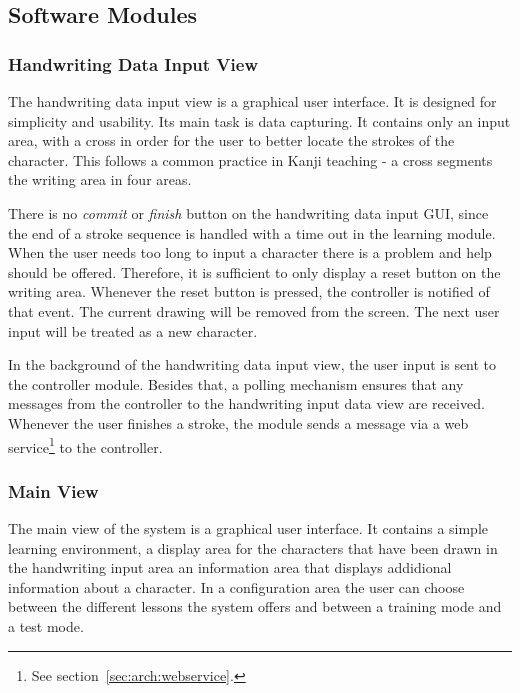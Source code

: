 \subsection{Software Modules}
\label{sec:arch:softwaremodules}

\subsubsection{Handwriting Data Input View}
\label{sec:arch:handwritingdatainputview}


The handwriting data input view is a graphical user interface. It is designed for
simplicity and usability. Its main task is data capturing.
It contains only an input area, with a cross in order for the user to better 
locate the strokes of the character. This follows a common practice in Kanji 
teaching - a cross segments the writing area in four areas.

There is no \emph{commit} or \emph{finish} button on the handwriting data 
input GUI, since the end of a stroke sequence is handled with a time out in 
the learning module. When the user needs too long to input a character there 
is a problem and help should be offered.
Therefore, it is sufficient to only display a reset button on the writing area.
Whenever the reset button is pressed, the controller is notified of that event.
The current drawing will be removed from the screen. The next user input will
be treated as a new character.

In the background of the handwriting data input view, the user input is sent to 
the controller module. Besides that, a polling mechanism ensures that any 
messages from the controller to the handwriting input data view are received.
Whenever the user finishes a stroke, the module sends a message via a web 
service\footnote{See section~\ref{sec:arch:webservice}.} to the controller.

\subsubsection{Main View}
\label{sec:arch:mainview}

The main view of the system is a graphical user interface. It contains a simple
learning environment, a display area for the characters that have been drawn
in the handwriting input area an information area that displays addidional 
information about a character. In a configuration area the user can choose 
between the different lessons the system offers and between a training mode
and a test mode.

